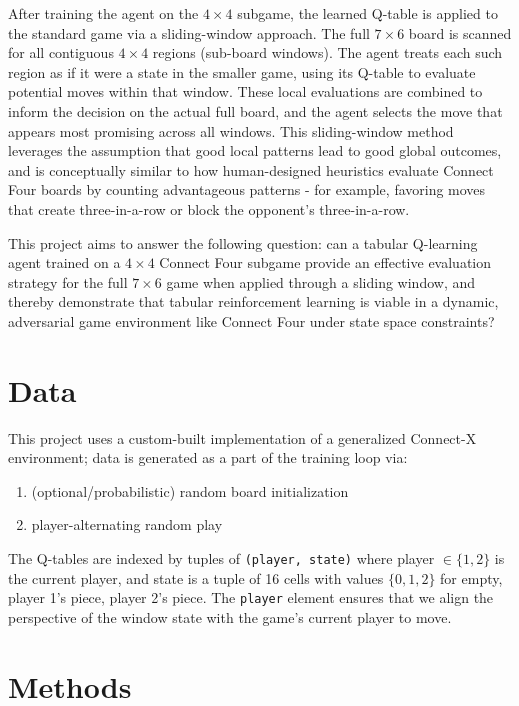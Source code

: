 \documentclass[10pt]{extarticle}
\begin{document}
After training the agent on the $4 \times 4$ subgame, the learned Q-table is applied to the standard game via a sliding-window approach. The full $7 \times 6$ board is scanned for all contiguous $4 \times 4$ regions (sub-board windows). The agent treats each such region as if it were a state in the smaller game, using its Q-table to evaluate potential moves within that window. These local evaluations are combined to inform the decision on the actual full board, and the agent selects the move that appears most promising across all windows. This sliding-window method leverages the assumption that good local patterns lead to good global outcomes, and is conceptually similar to how human-designed heuristics evaluate Connect Four boards by counting advantageous patterns - for example, favoring moves that create three-in-a-row or block the opponent's three-in-a-row.

This project aims to answer the following question: can a tabular Q-learning agent trained on a $4 \times 4$ Connect Four subgame provide an effective evaluation strategy for the full $7 \times 6$ game when applied through a sliding window, and thereby demonstrate that tabular reinforcement learning is viable in a dynamic, adversarial game environment like Connect Four under state space constraints?

\section{Data}

This project uses a custom-built implementation of a generalized Connect-X environment; data is generated as a part of the training loop via:

\begin{enumerate}[parsep=5pt, label=\alph*)]
	\item (optional/probabilistic) random board initialization 
	\item player-alternating random play
\end{enumerate}


The Q-tables are indexed by tuples of \verb|(player, state)| where player $\in \{1,2\}$ is the current player, and state is a tuple of 16 cells with values $\{0,1,2\}$ for empty, player 1's piece, player 2's piece. The \verb|player| element ensures that we align the perspective of the window state with the game's current player to move.

\section{Methods}
\end{document}
